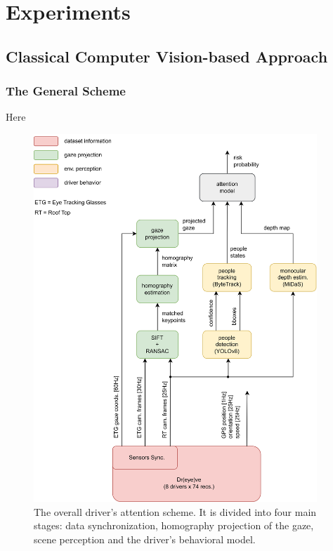 \chapter{Experiments}

\section{Classical Computer Vision-based Approach}
\subsection{The General Scheme}
Here
\begin{figure}
    \centering
    \includegraphics[width=0.95\textwidth]{images/dreyeve/classic_scheme.png}
    \vspace*{0.6cm}
    \caption{The overall driver's attention scheme. It is divided into four main 
    stages: data synchronization, homography projection of the gaze, scene 
    perception and the driver's behavioral model.
    }
    \label{fig:driver_attention}
\end{figure}
